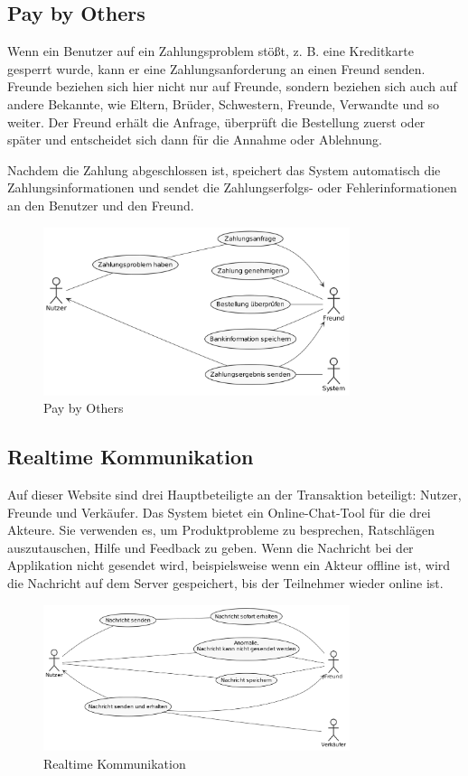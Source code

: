 \subsection{Pay by Others}

Wenn ein Benutzer auf ein Zahlungsproblem stößt, z. B. eine Kreditkarte gesperrt wurde, kann er eine Zahlungsanforderung an einen Freund senden. Freunde beziehen sich hier nicht nur auf Freunde, sondern beziehen sich auch auf andere Bekannte, wie Eltern, Brüder, Schwestern, Freunde, Verwandte und so weiter. Der Freund erhält die Anfrage, überprüft die Bestellung zuerst oder später und entscheidet sich dann für die Annahme oder Ablehnung.

Nachdem die Zahlung abgeschlossen ist, speichert das System automatisch die Zahlungsinformationen und sendet die Zahlungserfolgs- oder Fehlerinformationen an den Benutzer und den Freund.

\begin{figure}[htbp]
	\centering
	\includegraphics[width=0.8\textwidth]{uml-diagramme/pay-by-others.png}
	\caption{Pay by Others}
	\label{fig:pay-by-others}
\end{figure}


\subsection{Realtime Kommunikation}

Auf dieser Website sind drei Hauptbeteiligte an der Transaktion beteiligt: Nutzer, Freunde und Verkäufer. Das System bietet ein Online-Chat-Tool für die  drei Akteure. Sie  verwenden es, um Produktprobleme zu besprechen, Ratschlägen auszutauschen, Hilfe und Feedback zu geben. Wenn die Nachricht bei der Applikation nicht gesendet wird, beispielsweise wenn ein Akteur offline ist, wird die Nachricht  auf dem Server gespeichert, bis der Teilnehmer wieder online ist.

\begin{figure}[htbp]
	\centering
	\includegraphics[width=0.8\textwidth]{uml-diagramme/real-time-communication.png}
	\caption{Realtime Kommunikation}
	\label{fig:real-time-communication}
\end{figure}
